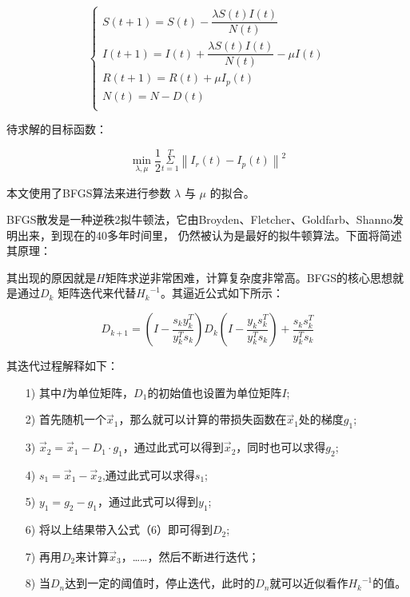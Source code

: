 \documentclass[bwprint]{gmcmthesis}
\numberwithin{figure}{section}
\begin{document}
\begin{equation} \label{}
    \begin{cases}
        S\left( t+1 \right) =S\left( t \right) -\dfrac{\lambda S\left( t \right) I\left( t \right)}{N\left( t \right)}\\
        I\left( t+1 \right) =I\left( t \right) +\dfrac{\lambda S\left( t \right) I\left( t \right)}{N\left( t \right)}-\mu I\left( t \right)\\
        R\left( t+1 \right) =R\left( t \right) +\mu I_p\left( t \right)\\
        N\left( t \right) =N-D\left( t \right)\\
    \end{cases}
\end{equation}


\par 待求解的目标函数：

\begin{equation} \label{}
    \underset{\lambda ,\mu}{\min}\frac{1}{2}\underset{t=1}{\overset{T}{\varSigma}}\left\| I_r\left( t \right) -I_p\left( t \right) \right\| ^2
\end{equation}

\par 本文使用了BFGS算法来进行参数 $\lambda$ 与 $\mu$ 的拟合。

\par BFGS散发是一种逆秩2拟牛顿法，它由Broyden、Fletcher、Goldfarb、Shanno发明出来，到现在的40多年时间里，
仍然被认为是最好的拟牛顿算法。下面将简述其原理：

\par 其出现的原因就是$H$矩阵求逆非常困难，计算复杂度非常高。BFGS的核心思想就是通过$D_k$
矩阵迭代来代替${H_k}^{-1}$。其逼近公式如下所示：

\begin{equation} \label{}
    D_{k+1}=\left( I-\frac{s_ky_{k}^{T}}{y_{k}^{T}s_k} \right) D_k\left( I-\dfrac{y_ks_{k}^{T}}{y_{k}^{T}s_k} \right) +\dfrac{s_ks_{k}^{T}}{y_{k}^{T}s_k}
\end{equation}

\par 其迭代过程解释如下：

\begin{itemize}
    \item[1)] 其中$I$为单位矩阵，$D_1$的初始值也设置为单位矩阵$I$;
    \item[2)] 首先随机一个$\vec{x}_1$，那么就可以计算的带损失函数在$\vec{x}_1$处的梯度$g_1$;
    \item[3)] $\vec{x}_2=\vec{x}_1-D_1\cdot g_1$，通过此式可以得到$\vec{x}_2$，同时也可以求得$g_2$;
    \item[4)] $s_1=\vec{x}_1-\vec{x}_2$,通过此式可以求得$s_1$;
    \item[5)] $y_1=g_2-g_1$，通过此式可以得到$y_1$;
    \item[6)] 将以上结果带入公式（6）即可得到$D_2$;
    \item[7)] 再用$D_2$来计算$\vec{x}_3$，……，然后不断进行迭代；
    \item[8)] 当$D_n$达到一定的阈值时，停止迭代，此时的$D_n$就可以近似看作${H_k}^{-1}$的值。
\end{itemize}
\end{document}
